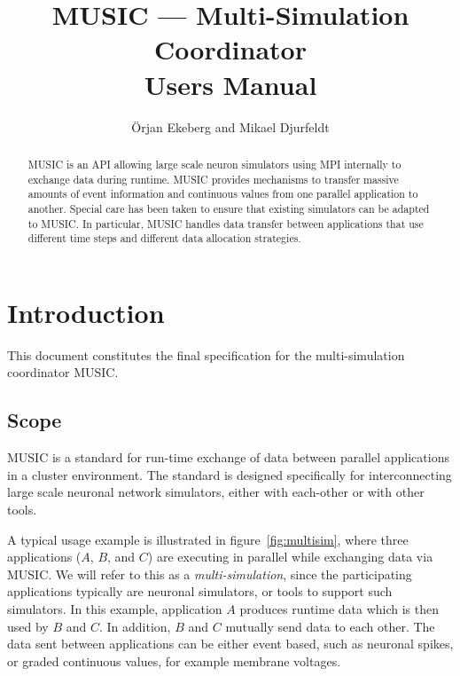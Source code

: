 \documentclass[a4paper,twoside]{report}
\begin{document}
\lstset{language=C++,identifierstyle=\ttfamily}

\title{MUSIC --- Multi-Simulation Coordinator\\[2ex]
  Users Manual\\}

\author{Örjan Ekeberg and Mikael Djurfeldt}

\maketitle

\begin{abstract}
  MUSIC is an API allowing large scale neuron simulators using MPI
  internally to exchange data during runtime.  MUSIC provides
  mechanisms to transfer massive amounts of event information and
  continuous values from one parallel application to another.  Special
  care has been taken to ensure that existing simulators can be
  adapted to MUSIC.  In particular, MUSIC handles data transfer
  between applications that use different time steps and different
  data allocation strategies.
\end{abstract}


\tableofcontents

\listoffigures

\chapter{Introduction}

This document constitutes the final specification for the
multi-simulation coordinator MUSIC.

\section{Scope}

MUSIC is a standard for run-time exchange of data between parallel
applications in a cluster environment.  The standard is designed
specifically for interconnecting large scale neuronal network
simulators, either with each-other or with other tools.

A typical usage example is illustrated in figure~\ref{fig:multisim},
where three applications ($A$, $B$, and $C$) are executing in parallel
while exchanging data via MUSIC.  We will refer to this as a
\emph{multi-simulation}, since the participating applications
typically are neuronal simulators, or tools to support such
simulators.  In this example, application $A$ produces runtime data
which is then used by $B$ and $C$.  In addition, $B$ and $C$ mutually
send data to each other.  The data sent between applications can be
either event based, such as neuronal spikes, or graded continuous
values, for example membrane voltages.
\end{document}
